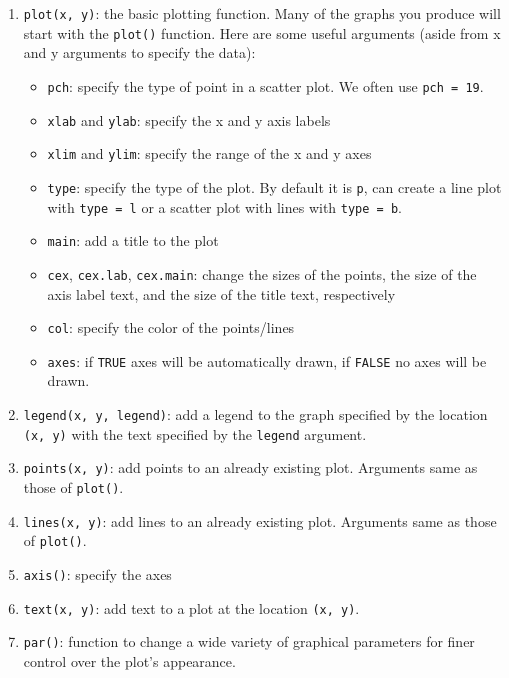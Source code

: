 \documentclass[
]{krantz}
\providecommand{\tightlist}{%
  \setlength{\itemsep}{0pt}\setlength{\parskip}{0pt}}
\begin{document}
\begin{enumerate}
\def\labelenumi{\arabic{enumi}.}
\tightlist
\item
  \texttt{plot(x,\ y)}: the basic plotting function. Many of the graphs you produce will start with the \texttt{plot()} function. Here are some useful arguments (aside from x and y arguments to specify the data):

  \begin{itemize}
  \tightlist
  \item
    \texttt{pch}: specify the type of point in a scatter plot. We often use \texttt{pch\ =\ 19}.
  \item
    \texttt{xlab} and \texttt{ylab}: specify the x and y axis labels
  \item
    \texttt{xlim} and \texttt{ylim}: specify the range of the x and y axes
  \item
    \texttt{type}: specify the type of the plot. By default it is \texttt{p}, can create a line plot with \texttt{type\ =\ \textquotesingle{}l\textquotesingle{}} or a scatter plot with lines with \texttt{type\ =\ \textquotesingle{}b\textquotesingle{}}.
  \item
    \texttt{main}: add a title to the plot
  \item
    \texttt{cex}, \texttt{cex.lab}, \texttt{cex.main}: change the sizes of the points, the size of the axis label text, and the size of the title text, respectively
  \item
    \texttt{col}: specify the color of the points/lines
  \item
    \texttt{axes}: if \texttt{TRUE} axes will be automatically drawn, if \texttt{FALSE} no axes will be drawn.
  \end{itemize}
\item
  \texttt{legend(x,\ y,\ legend)}: add a legend to the graph specified by the location \texttt{(x,\ y)} with the text specified by the \texttt{legend} argument.
\item
  \texttt{points(x,\ y)}: add points to an already existing plot. Arguments same as those of \texttt{plot()}.
\item
  \texttt{lines(x,\ y)}: add lines to an already existing plot. Arguments same as those of \texttt{plot()}.
\item
  \texttt{axis()}: specify the axes
\item
  \texttt{text(x,\ y)}: add text to a plot at the location \texttt{(x,\ y)}.
\item
  \texttt{par()}: function to change a wide variety of graphical parameters for finer control over the plot's appearance.
\end{enumerate}
\end{document}
